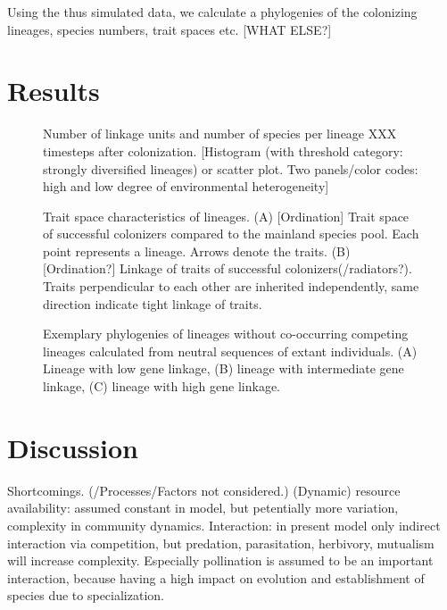 \documentclass[a4paper]{scrartcl}
\begin{document}
Using the thus simulated data, we calculate a phylogenies of the colonizing lineages, species numbers, trait spaces etc. [WHAT ELSE?]

\section{Results}

\begin{figure}
  \caption{Number of linkage units and number of species per lineage XXX timesteps after colonization.
    [Histogram (with threshold category: strongly diversified lineages) or scatter plot. Two panels/color codes: high and low degree of environmental heterogeneity]}
  \label{specieslinkage}
\end{figure}

\begin{figure}
  \caption{Trait space characteristics of lineages.
    (A) [Ordination] Trait space of successful colonizers compared to the mainland species pool. Each point represents a lineage.
    Arrows denote the traits.
    (B) [Ordination?] Linkage of traits of successful colonizers(/radiators?). Traits perpendicular to each other are inherited independently,
  same direction indicate tight linkage of traits.}
  \label{traitspace}
\end{figure}

\begin{figure}
  \caption{Exemplary phylogenies of lineages without co-occurring competing lineages calculated from neutral sequences of
    extant individuals.
    (A) Lineage with low gene linkage,
    (B) lineage with intermediate gene linkage,
    (C) lineage with high gene linkage.}
  \label{phylogenies}
\end{figure}

\section{Discussion}
Shortcomings. (/Processes/Factors not considered.)
(Dynamic) resource availability: assumed constant in model, but petentially more variation, complexity in community dynamics.
Interaction: in present model only indirect interaction via competition, but predation, parasitation, herbivory, mutualism will increase complexity.
Especially pollination is assumed to be an important interaction, because having a high impact on evolution and establishment of species due to specialization.
\end{document}
